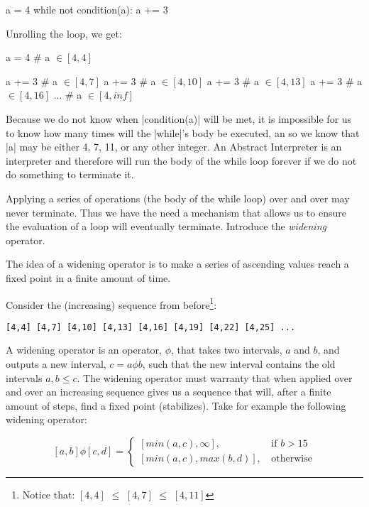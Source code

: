 \begin{pythoncode}
a = 4
while not condition(a):
  a += 3
\end{pythoncode}

Unrolling the loop, we get:

\begin{pythoncode}
a = 4     # a $\in [4,4]$

  a += 3  # a $\in [4,7]$
  a += 3  # a $\in [4,10]$
  a += 3  # a $\in [4,13]$
  a += 3  # a $\in [4,16]$
  ...
  # a $\in [4, inf]$
\end{pythoncode}

Because we do not know when \pycode|condition(a)| will be met, it is
impossible for us to know how many times will the \pycode|while|'s body
be executed, an so we know that \pycode|a| may be either 4, 7, 11, or
any other integer. An Abstract Interpreter is an interpreter and
therefore will run the body of the while loop forever if we do not do
something to terminate it.

Applying a series of operations (the body of the while loop) over and
over may never terminate. Thus we have the need a mechanism that allows
us to ensure the evaluation of a loop will eventually terminate.
Introduce the \emph{widening} operator.

The idea of a widening operator is to make a series of ascending values
reach a fixed point in a finite amount of time.

Consider the (increasing) sequence from before\footnote{Notice that:
$[4,4]$ \(\le\) $[4,7]$ \(\le\) $[4,11]$}:

\begin{verbatim}
[4,4] [4,7] [4,10] [4,13] [4,16] [4,19] [4,22] [4,25] ...
\end{verbatim}

A widening operator is an operator, \(\phi{}\), that takes two
intervals, \(a\) and \(b\), and outputs a new interval,
\(c = a \phi b\), such that the new interval contains the old intervals
\(a, b \le c\). The widening operator must warranty that when applied
over and over an increasing sequence gives us a sequence that will,
after a finite amount of steps, find a fixed point (stabilizes). Take
for example the following widening operator:

\[[a, b] \phi [c, d] =
     \begin{cases}
       [min(a,c), \infty]\text{, } & \text{if } b > 15 \\
       [min(a,c), max(b,d)]\text{, } & \text{otherwise}
     \end{cases}\]

